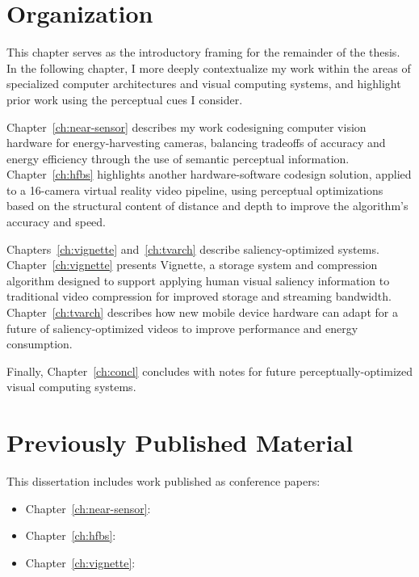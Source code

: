 \section{Organization}
This chapter serves as the introductory framing for the remainder of the thesis.
In the following chapter, I more deeply contextualize my work within the areas of specialized computer architectures and visual computing systems, and highlight prior work using the perceptual cues I consider.

Chapter~\ref{ch:near-sensor} describes my work codesigning computer vision hardware for energy-harvesting cameras, balancing tradeoffs of accuracy and energy efficiency through the use of semantic perceptual information. Chapter~\ref{ch:hfbs} highlights another hardware-software codesign solution, applied to a 16-camera virtual reality video pipeline, using perceptual optimizations based on the structural content of distance and depth to improve the algorithm's accuracy and speed.

Chapters~\ref{ch:vignette} and~\ref{ch:tvarch} describe saliency-optimized systems. Chapter~\ref{ch:vignette} presents Vignette, a storage system and compression algorithm designed to support applying human visual saliency information to traditional video compression for improved storage and streaming bandwidth.
Chapter~\ref{ch:tvarch} describes how new mobile device hardware can adapt for a future of saliency-optimized videos to improve performance and energy consumption.

Finally, Chapter~\ref{ch:concl} concludes with notes for future perceptually-optimized visual computing systems.

\section{Previously Published Material}

This dissertation includes work published as conference papers:

\begin{itemize}
  \item Chapter~\ref{ch:near-sensor}: 
  \item Chapter~\ref{ch:hfbs}: 
  \item Chapter~\ref{ch:vignette}: 
\end{itemize}


